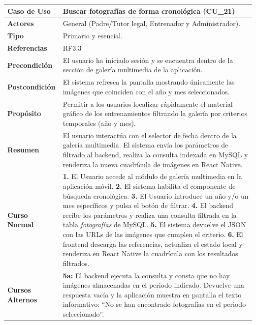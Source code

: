         \nopagebreak
        \begingroup
        \centering
        \footnotesize
        \renewcommand{\arraystretch}{0.95}
        \noindent\begin{tabularx}{\textwidth}{|l|X|}
        \hline
        \rowcolor[HTML]{EFEFEF} 
        \textbf{Caso de Uso} & \textbf{Buscar fotografías de forma cronológica (CU\_21)} \\ \hline
        \textbf{Actores} & General (Padre/Tutor legal, Entrenador y Administrador). \\ \hline
        \textbf{Tipo} & Primario y esencial. \\ \hline
        \textbf{Referencias} & RF3.3 \\ \hline
        \textbf{Precondición} & El usuario ha iniciado sesión y se encuentra dentro de la sección de galería multimedia de la aplicación. \\ \hline
        \textbf{Postcondición} & El sistema refresca la pantalla mostrando únicamente las imágenes que coinciden con el año y mes seleccionados. \\ \hline
        \textbf{Propósito} & Permitir a los usuarios localizar rápidamente el material gráfico de los entrenamientos filtrando la galería por criterios temporales (año y mes). \\ \hline
        \textbf{Resumen} & El usuario interactúa con el selector de fecha dentro de la galería multimedia. El sistema envía los parámetros de filtrado al backend, realiza la consulta indexada en MySQL y renderiza la nueva cuadrícula de imágenes en React Native. \\ \hline
        \textbf{Curso Normal} & 
        \textbf{1.} El Usuario accede al módulo de galería multimedia en la aplicación móvil.\newline
        \textbf{2.} El sistema habilita el componente de búsqueda cronológica.\newline
        \textbf{3.} El Usuario introduce un año y/o un mes específicos y pulsa el botón de filtrar.\newline
        \textbf{4.} El backend recibe los parámetros y realiza una consulta filtrada en la tabla \textit{fotografías} de MySQL.\newline
        \textbf{5.} El sistema devuelve el JSON con las URLs de las imágenes que cumplen el criterio.\newline
        \textbf{6.} El frontend descarga las referencias, actualiza el estado local y renderiza en React Native la cuadrícula con los resultados filtrados. \\ \hline
        \textbf{Cursos Alternos} & 
        \textbf{5a:} El backend ejecuta la consulta y consta que no hay imágenes almacenadas en el periodo indicado. Devuelve una respuesta vacía y la aplicación muestra en pantalla el texto informativo: ``No se han encontrado fotografías en el periodo seleccionado''. \\ \hline
        \end{tabularx}
        \label{tab:cu_21}
        \endgroup

